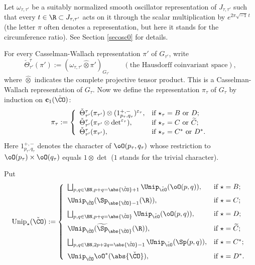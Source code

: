 \documentclass[ssunip.tex]{subfiles}
\begin{document}
 Let $\omega_{\tau, \tau'}$ be a suitably normalized smooth oscillator representation of $J_{\tau, \tau'}$ such that every $t\in \R\subset J_{\tau, \tau'}$ acts on it through the scalar multiplication by $e^{2\pi \sqrt{-1}\, t}$ (the letter $\pi$  often denotes a representation, but here it stands for the circumference ratio).  See Section \ref{secosc0} for details.

 For every  Casselman-Wallach representation $\pi'$ of $G_{\tau'}$, write
 \[
   \check \Theta_{\tau'}^{\tau}(\pi'):=(\omega_{\tau, \tau'}\widehat \otimes \pi')_{G_{\tau'}} \qquad (\textrm{the Hausdorff coinvariant space}),
 \]
 where $\widehat \otimes$ indicates the complete projective tensor product. This is a Casselman-Wallach representation of $G_\tau$.
 Now we define the representation $\pi_\tau$ of $G_\tau$ by induction on $\mathbf c_1(\check \CO)$:
 \[
   \pi_\tau:=\left\{
     \begin{array}{ll}
         \check \Theta_{\tau'}^{\tau}(\pi_{\tau'})\otimes (1_{p_\tau, q_\tau}^{+,-})^{\varepsilon_\tau}, &\hbox{if  $\star_\tau=B$ or $D$}; \\
         \check \Theta_{\tau'}^{\tau}(\pi_{\tau'}\otimes \det^{\varepsilon_\tau}), &\hbox{if $\star_\tau=C$ or $\widetilde C$}; \\
              \check \Theta_{\tau'}^{\tau}(\pi_{\tau'}), &\hbox{if $\star_\tau=C^*$ or $D^*$}. \\
            \end{array}
   \right.
 \]
 Here $1_{p_\tau, q_\tau}^{+,-}$ denotes the character of $\oO(p_\tau, q_\tau)$ whose restriction to $\oO(p_\tau)\times \oO(q_\tau)$ equals $1\otimes \det$ ($1$ stands for the trivial character).


 Put
\[
  \mathrm{Unip}_{\star}(\check \CO):=\left\{
     \begin{array}{ll}
         \bigsqcup_{p,q\in \BN, p+q=\abs{\check \CO}+1} \Unip_{\check \cO}(\oO(p,q)), &\hbox{if $\star=B$}; \medskip\\
           \Unip_{\check \CO}(\Sp_{\abs{\check \CO}-1}(\R)), &\hbox{if $\star=C$}; \medskip\\
           \bigsqcup_{p,q\in \BN, p+q=\abs{\check \CO}} \Unip_{\check \cO}(\oO(p,q)), &\hbox{if $\star=D$}; \medskip\\
          \Unip_{\check \CO}(\widetilde \Sp_{\abs{\check \CO}}(\R)), &\hbox{if $\star=\widetilde{ C}$}; \medskip \\
     \bigsqcup_{p,q\in \BN, 2p+2q=\abs{\check \CO}-1} \Unip_{\check \cO}(\Sp(p,q)), &\hbox{if $\star=C^*$}; \medskip \\
          \Unip_{\check \CO} \oO^*(\abs{\check \CO}), &\hbox{if $\star=D^*$}.\\
            \end{array}
   \right.
\]
\end{document}
